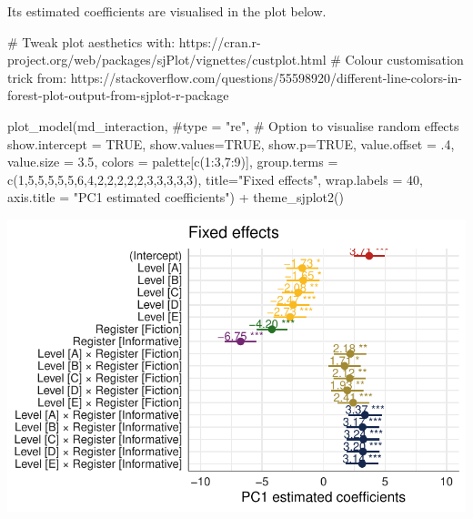 \documentclass[
  letterpaper,
  DIV=11,
  numbers=noendperiod]{scrreprt}
\newenvironment{Shaded}{\begin{snugshade}}{\end{snugshade}}
\newcommand{\AttributeTok}[1]{\textcolor[rgb]{0.40,0.45,0.13}{#1}}
\newcommand{\CommentTok}[1]{\textcolor[rgb]{0.37,0.37,0.37}{#1}}
\newcommand{\ConstantTok}[1]{\textcolor[rgb]{0.56,0.35,0.01}{#1}}
\newcommand{\DecValTok}[1]{\textcolor[rgb]{0.68,0.00,0.00}{#1}}
\newcommand{\FloatTok}[1]{\textcolor[rgb]{0.68,0.00,0.00}{#1}}
\newcommand{\FunctionTok}[1]{\textcolor[rgb]{0.28,0.35,0.67}{#1}}
\newcommand{\NormalTok}[1]{\textcolor[rgb]{0.00,0.23,0.31}{#1}}
\newcommand{\SpecialCharTok}[1]{\textcolor[rgb]{0.37,0.37,0.37}{#1}}
\newcommand{\StringTok}[1]{\textcolor[rgb]{0.13,0.47,0.30}{#1}}
\begin{document}
Its estimated coefficients are visualised in the plot below.

\begin{Shaded}
\begin{Highlighting}[]
\CommentTok{\# Tweak plot aesthetics with: https://cran.r{-}project.org/web/packages/sjPlot/vignettes/custplot.html}
\CommentTok{\# Colour customisation trick from: https://stackoverflow.com/questions/55598920/different{-}line{-}colors{-}in{-}forest{-}plot{-}output{-}from{-}sjplot{-}r{-}package}

\FunctionTok{plot\_model}\NormalTok{(md\_interaction, }
           \CommentTok{\#type = "re", \# Option to visualise random effects }
           \AttributeTok{show.intercept =} \ConstantTok{TRUE}\NormalTok{,}
           \AttributeTok{show.values=}\ConstantTok{TRUE}\NormalTok{, }
           \AttributeTok{show.p=}\ConstantTok{TRUE}\NormalTok{,}
           \AttributeTok{value.offset =}\NormalTok{ .}\DecValTok{4}\NormalTok{,}
           \AttributeTok{value.size =} \FloatTok{3.5}\NormalTok{,}
           \AttributeTok{colors =}\NormalTok{ palette[}\FunctionTok{c}\NormalTok{(}\DecValTok{1}\SpecialCharTok{:}\DecValTok{3}\NormalTok{,}\DecValTok{7}\SpecialCharTok{:}\DecValTok{9}\NormalTok{)],}
           \AttributeTok{group.terms =} \FunctionTok{c}\NormalTok{(}\DecValTok{1}\NormalTok{,}\DecValTok{5}\NormalTok{,}\DecValTok{5}\NormalTok{,}\DecValTok{5}\NormalTok{,}\DecValTok{5}\NormalTok{,}\DecValTok{5}\NormalTok{,}\DecValTok{6}\NormalTok{,}\DecValTok{4}\NormalTok{,}\DecValTok{2}\NormalTok{,}\DecValTok{2}\NormalTok{,}\DecValTok{2}\NormalTok{,}\DecValTok{2}\NormalTok{,}\DecValTok{2}\NormalTok{,}\DecValTok{3}\NormalTok{,}\DecValTok{3}\NormalTok{,}\DecValTok{3}\NormalTok{,}\DecValTok{3}\NormalTok{,}\DecValTok{3}\NormalTok{), }
           \AttributeTok{title=}\StringTok{"Fixed effects"}\NormalTok{,}
           \AttributeTok{wrap.labels =} \DecValTok{40}\NormalTok{,}
           \AttributeTok{axis.title =} \StringTok{"PC1 estimated coefficients"}\NormalTok{) }\SpecialCharTok{+}
  \FunctionTok{theme\_sjplot2}\NormalTok{() }
\end{Highlighting}
\end{Shaded}

\includegraphics{AppendixH_files/figure-pdf/Dim1fixed-1.pdf}
\end{document}
